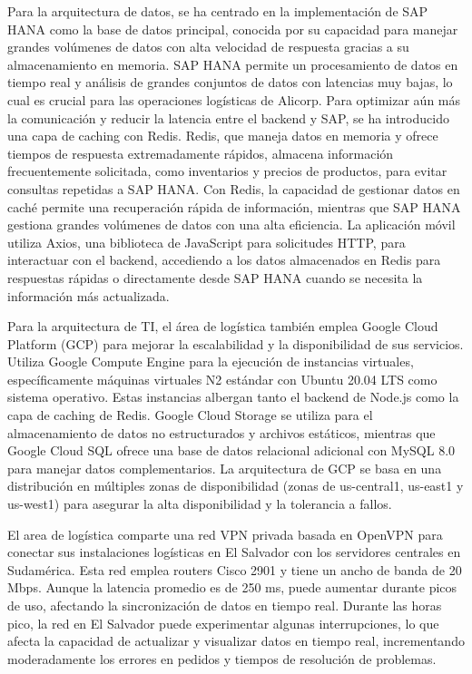 Para la arquitectura de datos, se ha centrado en la implementación de SAP HANA como la base de datos principal, conocida por su capacidad para manejar grandes volúmenes de datos con alta velocidad de respuesta gracias a su almacenamiento en memoria. SAP HANA permite un procesamiento de datos en tiempo real y análisis de grandes conjuntos de datos con latencias muy bajas, lo cual es crucial para las operaciones logísticas de Alicorp. Para optimizar aún más la comunicación y reducir la latencia entre el backend y SAP, se ha introducido una capa de caching con Redis. Redis, que maneja datos en memoria y ofrece tiempos de respuesta extremadamente rápidos, almacena información frecuentemente solicitada, como inventarios y precios de productos, para evitar consultas repetidas a SAP HANA. Con Redis, la capacidad de gestionar datos en caché permite una recuperación rápida de información, mientras que SAP HANA gestiona grandes volúmenes de datos con una alta eficiencia. La aplicación móvil utiliza Axios, una biblioteca de JavaScript para solicitudes HTTP, para interactuar con el backend, accediendo a los datos almacenados en Redis para respuestas rápidas o directamente desde SAP HANA cuando se necesita la información más actualizada. 

Para la arquitectura de TI, el área de logística también emplea Google Cloud Platform (GCP) para mejorar la escalabilidad y la disponibilidad de sus servicios. Utiliza Google Compute Engine para la ejecución de instancias virtuales, específicamente máquinas virtuales N2 estándar con Ubuntu 20.04 LTS como sistema operativo. Estas instancias albergan tanto el backend de Node.js como la capa de caching de Redis. Google Cloud Storage se utiliza para el almacenamiento de datos no estructurados y archivos estáticos, mientras que Google Cloud SQL ofrece una base de datos relacional adicional con MySQL 8.0 para manejar datos complementarios. La arquitectura de GCP se basa en una distribución en múltiples zonas de disponibilidad (zonas de us-central1, us-east1 y us-west1) para asegurar la alta disponibilidad y la tolerancia a fallos.

El area de logística comparte una red VPN privada basada en OpenVPN para conectar sus instalaciones logísticas en El Salvador con los servidores centrales en Sudamérica. Esta red emplea routers Cisco 2901 y tiene un ancho de banda de 20 Mbps. Aunque la latencia promedio es de 250 ms, puede aumentar durante picos de uso, afectando la sincronización de datos en tiempo real. Durante las horas pico, la red en El Salvador puede experimentar algunas interrupciones, lo que afecta la capacidad de actualizar y visualizar datos en tiempo real, incrementando moderadamente los errores en pedidos y tiempos de resolución de problemas.


